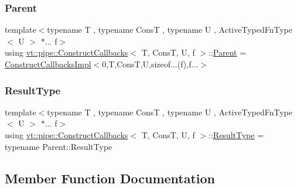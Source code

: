 \subsubsection{\texorpdfstring{Parent}{Parent}}
{\footnotesize\ttfamily template$<$typename T , typename ConsT , typename U , Active\+Typed\+Fn\+Type$<$ U $>$ $\ast$... f$>$ \\
using \hyperlink{structvt_1_1pipe_1_1_construct_callbacks}{vt\+::pipe\+::\+Construct\+Callbacks}$<$ T, ConsT, U, f $>$\+::\hyperlink{structvt_1_1pipe_1_1_construct_callbacks_a9d1506b31e3540964dc64a5a63497205}{Parent} =  \hyperlink{structvt_1_1pipe_1_1_construct_callbacks_impl}{Construct\+Callbacks\+Impl}$<$0,T,ConsT,U,sizeof...(f),f...$>$}

\mbox{\label{structvt_1_1pipe_1_1_construct_callbacks_afadffbdf96d7bf4f83498ef255815119}} 
\subsubsection{\texorpdfstring{Result\+Type}{ResultType}}
{\footnotesize\ttfamily template$<$typename T , typename ConsT , typename U , Active\+Typed\+Fn\+Type$<$ U $>$ $\ast$... f$>$ \\
using \hyperlink{structvt_1_1pipe_1_1_construct_callbacks}{vt\+::pipe\+::\+Construct\+Callbacks}$<$ T, ConsT, U, f $>$\+::\hyperlink{structvt_1_1pipe_1_1_construct_callbacks_afadffbdf96d7bf4f83498ef255815119}{Result\+Type} =  typename Parent\+::\+Result\+Type}



\subsection{Member Function Documentation}
\mbox{\label{structvt_1_1pipe_1_1_construct_callbacks_ac2f7f0160104776816dca1bcc8602ee1}} 
